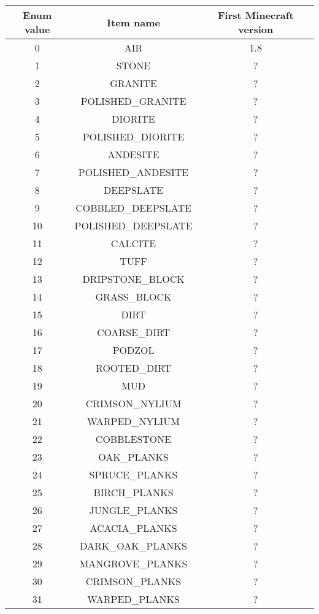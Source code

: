 \documentclass[11pt]{article}
\newcommand\myworries[1]{\textcolor{purple}{#1}}
\begin{document}
\begin{longtable}{ |c|c|c| }
	\hline
	Enum value & Item name & First Minecraft version \\
	\hline
	\endhead
	0 & AIR & 1.8 \\
	1 & STONE & \myworries{?} \\
	2 & GRANITE & \myworries{?} \\
	3 & POLISHED\_GRANITE & \myworries{?} \\
	4 & DIORITE & \myworries{?} \\
	5 & POLISHED\_DIORITE & \myworries{?} \\
	6 & ANDESITE & \myworries{?} \\
	7 & POLISHED\_ANDESITE & \myworries{?} \\
	8 & DEEPSLATE & \myworries{?} \\
	9 & COBBLED\_DEEPSLATE & \myworries{?} \\
	10 & POLISHED\_DEEPSLATE & \myworries{?} \\
	11 & CALCITE & \myworries{?} \\
	12 & TUFF & \myworries{?} \\
	13 & DRIPSTONE\_BLOCK & \myworries{?} \\
	14 & GRASS\_BLOCK & \myworries{?} \\
	15 & DIRT & \myworries{?} \\
	16 & COARSE\_DIRT & \myworries{?} \\
	17 & PODZOL & \myworries{?} \\
	18 & ROOTED\_DIRT & \myworries{?} \\
	19 & MUD & \myworries{?} \\
	20 & CRIMSON\_NYLIUM & \myworries{?} \\
	21 & WARPED\_NYLIUM & \myworries{?} \\
	22 & COBBLESTONE & \myworries{?} \\
	23 & OAK\_PLANKS & \myworries{?} \\
	24 & SPRUCE\_PLANKS & \myworries{?} \\
	25 & BIRCH\_PLANKS & \myworries{?} \\
	26 & JUNGLE\_PLANKS & \myworries{?} \\
	27 & ACACIA\_PLANKS & \myworries{?} \\
	28 & DARK\_OAK\_PLANKS & \myworries{?} \\
	29 & MANGROVE\_PLANKS & \myworries{?} \\
	30 & CRIMSON\_PLANKS & \myworries{?} \\
	31 & WARPED\_PLANKS & \myworries{?} \\

\end{longtable}
\end{document}
